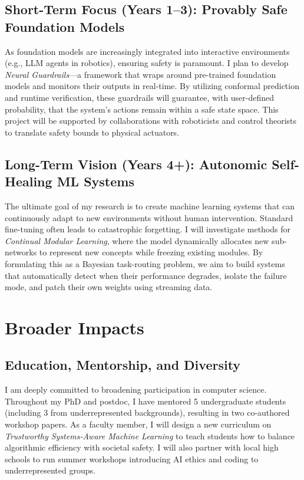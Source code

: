 \documentclass[10pt,a4paper]{article}
\begin{document}
\subsection{Short-Term Focus (Years 1--3): Provably Safe Foundation Models}
As foundation models are increasingly integrated into interactive environments (e.g., LLM agents in robotics), ensuring safety is paramount. I plan to develop \emph{Neural Guardrails}---a framework that wraps around pre-trained foundation models and monitors their outputs in real-time. By utilizing conformal prediction and runtime verification, these guardrails will guarantee, with user-defined probability, that the system's actions remain within a safe state space. This project will be supported by collaborations with roboticists and control theorists to translate safety bounds to physical actuators.

\subsection{Long-Term Vision (Years 4+): Autonomic Self-Healing ML Systems}
The ultimate goal of my research is to create machine learning systems that can continuously adapt to new environments without human intervention. Standard fine-tuning often leads to catastrophic forgetting. I will investigate methods for \emph{Continual Modular Learning}, where the model dynamically allocates new sub-networks to represent new concepts while freezing existing modules. By formulating this as a Bayesian task-routing problem, we aim to build systems that automatically detect when their performance degrades, isolate the failure mode, and patch their own weights using streaming data.

\section{Broader Impacts}
\subsection{Education, Mentorship, and Diversity}
I am deeply committed to broadening participation in computer science. Throughout my PhD and postdoc, I have mentored 5 undergraduate students (including 3 from underrepresented backgrounds), resulting in two co-authored workshop papers. As a faculty member, I will design a new curriculum on \emph{Trustworthy Systems-Aware Machine Learning} to teach students how to balance algorithmic efficiency with societal safety. I will also partner with local high schools to run summer workshops introducing AI ethics and coding to underrepresented groups.
\end{document}

